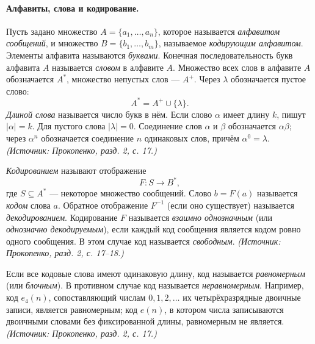 \documentclass[a4paper,12pt]{article}
\begin{document}
\paragraph{Алфавиты, слова и кодирование.}
Пусть задано множество \(A=\{a_1,\dots,a_n\}\), которое называется \emph{алфавитом сообщений}, и множество \(B=\{b_1,\dots,b_m\}\), называемое \emph{кодирующим алфавитом}. Элементы алфавита называются \emph{буквами}. Конечная последовательность букв алфавита \(A\) называется \emph{словом} в алфавите \(A\). Множество всех слов в алфавите \(A\) обозначается \(A^*\), множество непустых слов — \(A^+\). Через \(\lambda\) обозначается пустое слово:
\[
A^*=A^+\cup\{\lambda\}.
\]
\emph{Длиной слова} называется число букв в нём. Если слово \(\alpha\) имеет длину \(k\), пишут \(|\alpha|=k\). Для пустого слова \(|\lambda|=0\). Соединение слов \(\alpha\) и \(\beta\) обозначается \(\alpha\beta\); через \(\alpha^n\) обозначается соединение \(n\) одинаковых слов, причём \(\alpha^0=\lambda\).
\textit{(Источник: Прокопенко, разд. 2, с. 17.)}

\emph{Кодированием} называют отображение
\[
F\colon S\to B^*,
\]
где \(S\subseteq A^*\) — некоторое множество сообщений. Слово \(b=F(a)\) называется \emph{кодом} слова \(a\). Обратное отображение \(F^{-1}\) (если оно существует) называется \emph{декодированием}. Кодирование \(F\) называется \emph{взаимно однозначным} (или \emph{однозначно декодируемым}), если каждый код сообщения является кодом ровно одного сообщения. В этом случае код называется \emph{свободным}.
\textit{(Источник: Прокопенко, разд. 2, с. 17--18.)}

Если все кодовые слова имеют одинаковую длину, код называется \emph{равномерным} (или \emph{блочным}). В противном случае код называется \emph{неравномерным}. Например, код \(e_4(n)\), сопоставляющий числам \(0,1,2,\dots\) их четырёхразрядные двоичные записи, является равномерным; код \(e(n)\), в котором числа записываются двоичными словами без фиксированной длины, равномерным не является.
\textit{(Источник: Прокопенко, разд. 2, с. 17.)}
\end{document}
